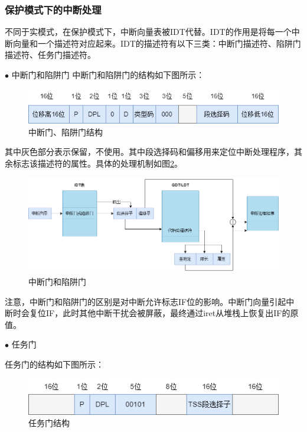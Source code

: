 \documentclass[UTF8,12pt]{ctexart}
\begin{document}
    \subsubsection{保护模式下的中断处理}
    不同于实模式，在保护模式下，中断向量表被IDT代替。IDT的作用是将每一个中断向量和一个描述符对应起来。IDT的描述符有以下三类：中断门描述符、陷阱门描述符、任务门描述符。
    
    $\bullet$ 中断门和陷阱门
    中断门和陷阱门的结构如下图所示：
    \begin{figure}[H]
        \centering
        \includegraphics[width=14cm]{images/中断门结构.png}
        \caption{中断门、陷阱门结构}
        \label{中断门结构}
    \end{figure}
    
    其中灰色部分表示保留，不使用。其中段选择码和偏移用来定位中断处理程序，其余标志该描述符的属性。具体的处理机制如图\ref{中断门和陷阱门}。
    
    \begin{figure}[H]
        \centering
        \includegraphics[width=14cm]{images/陷阱门处理机制.png}
        \caption{中断门和陷阱门}
        \label{中断门和陷阱门}
    \end{figure}
    
    注意，中断门和陷阱门的区别是对中断允许标志IF位的影响。中断门向量引起中断时会复位IF，此时其他中断干扰会被屏蔽，最终通过iret从堆栈上恢复出IF的原值。
    
    $\bullet$ 任务门
    
    任务门的结构如下图所示：
    \begin{figure}[H]
        \centering
        \includegraphics[width=12cm]{images/任务门结构.png}
        \caption{任务门结构}
        \label{任务门结构}
    \end{figure}
    
\end{document}
